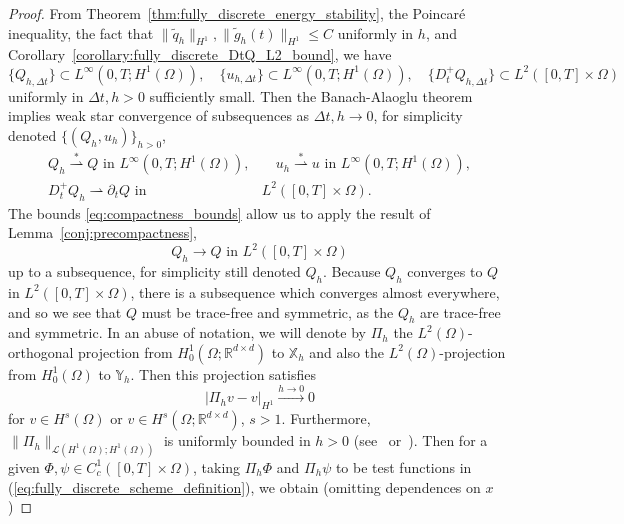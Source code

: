 \documentclass[10pt,letterpaper]{amsart}
\newcommand{\R}{\mathbb{R}}
\theoremstyle{definition}{\newtheorem{definition}[lemma]{Definition}}
\theoremstyle{note}{\newtheorem{claim}{Claim}[section]
\newtheorem*{claim*}{Claim}}
\numberwithin{equation}{section}
\begin{document}
\begin{proof}
From Theorem~\ref{thm:fully_discrete_energy_stability}, the Poincar\'e inequality, the fact that $\|\tilde q_h\|_{H^1}, \|\tilde g_h(t)\|_{H^1} \le C$ uniformly in $h$, and Corollary~\ref{corollary:fully_discrete_DtQ_L2_bound}, we have 
\begin{equation}
\label{eq:compactness_bounds}
    \{Q_{h,\Delta t}\} \subset L^\infty(0,T; H^1(\Omega)),\quad
    \{u_{h,\Delta t}\} \subset L^\infty(0,T; H^1(\Omega)),\quad
    \{D_t^+ Q_{h,\Delta t}\} \subset L^2([0,T]\times\Omega)
\end{equation}
uniformly in $\Delta t, h>0$ sufficiently small. Then the Banach-Alaoglu theorem implies weak star convergence of subsequences as $\Delta t, h\to 0$, for simplicity denoted $\{(Q_h, u_h)\}_{h>0}$,
\begin{subequations}
\begin{align}
    Q_h \overset{\ast}{\rightharpoonup} Q \text{ in } L^\infty(0,T; H^1(\Omega)),&\quad u_h \overset{\ast}{\rightharpoonup} u \text{ in } L^\infty(0,T; H^1(\Omega)),\\
    D_t^+ Q_h \rightharpoonup \partial_t Q\text{ in }& L^2([0,T]\times\Omega).
\end{align}
\end{subequations}
The bounds \eqref{eq:compactness_bounds} allow us to apply the result of Lemma~\ref{conj:precompactness},
\begin{equation}
    Q_h \to Q\text{ in } L^2([0,T]\times\Omega)
\end{equation}
up to a subsequence, for simplicity still denoted $Q_h$. Because $Q_h$ converges to $Q$ in $L^2([0,T]\times\Omega)$, there is a subsequence which converges almost everywhere, and so we see that $Q$ must be trace-free and symmetric, as the $Q_h$ are trace-free and symmetric. In an abuse of notation, we will denote by $\Pi_h$ the $L^2(\Omega)$-orthogonal projection from $H_0^1(\Omega;\R^{d\times d})$ to $\mathbb X_h$ and also the $L^2(\Omega)$-projection from $H_0^1(\Omega)$ to $\mathbb Y_h$. Then this projection satisfies
\begin{equation}
\label{eq:projection_convergence}
    \lvert\Pi_h v - v\rvert_{H^1} \overset{h\to0}{\longrightarrow} 0
\end{equation}
for $v\in H^s(\Omega)$ or $v\in H^s(\Omega;\R^{d\times d})$, $s>1$. Furthermore, $\|\Pi_h\|_{\mathcal{L}(H^1(\Omega);H^1(\Omega))}$ is uniformly bounded in $h>0$ (see~\cite{Bramble2002} or~\cite[Lemma 11.18]{Ern2021}). Then for a given $\Phi,\psi\in C^1_c([0,T]\times\Omega)$, taking $\Pi_h\Phi$ and $\Pi_h\psi$ to be test functions in (\ref{eq:fully_discrete_scheme_definition}), we obtain (omitting dependences on $x$)

\end{proof}
\end{document}
